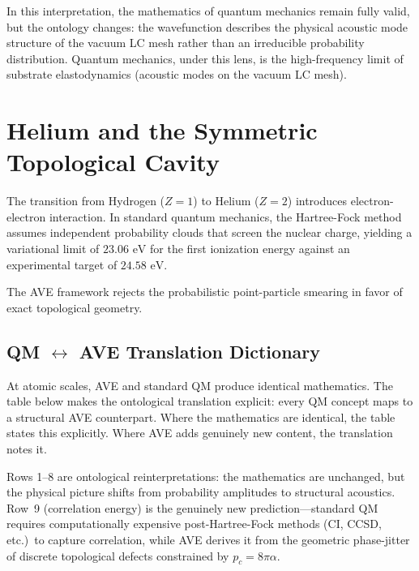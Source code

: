 In this interpretation, the mathematics of quantum mechanics remain fully valid, but the ontology changes: the wavefunction describes the physical acoustic mode structure of the vacuum LC mesh rather than an irreducible probability distribution. Quantum mechanics, under this lens, is the high-frequency limit of substrate elastodynamics (acoustic modes on the vacuum LC mesh).

\section{Helium and the Symmetric Topological Cavity}
\label{sec:helium_symmetric_cavity}

The transition from Hydrogen ($Z=1$) to Helium ($Z=2$) introduces electron-electron interaction. In standard quantum mechanics, the Hartree-Fock method assumes independent probability clouds that screen the nuclear charge, yielding a variational limit of $23.06\text{ eV}$ for the first ionization energy against an experimental target of $24.58\text{ eV}$.

The AVE framework rejects the probabilistic point-particle smearing in favor of exact topological geometry.

\subsection{QM $\leftrightarrow$ AVE Translation Dictionary}
\label{sec:qm_ave_translation}

At atomic scales, AVE and standard QM produce identical mathematics.  The table below makes the ontological translation explicit: every QM concept maps to a structural AVE counterpart.  Where the mathematics are identical, the table states this explicitly.  Where AVE adds genuinely new content, the translation notes it.



\noindent
Rows 1--8 are ontological reinterpretations: the mathematics are unchanged, but the physical picture shifts from probability amplitudes to structural acoustics.  Row~9 (correlation energy) is the genuinely new prediction---standard QM requires computationally expensive post-Hartree-Fock methods (CI, CCSD, etc.)\ to capture correlation, while AVE derives it from the geometric phase-jitter of discrete topological defects constrained by $p_c = 8\pi\alpha$.

